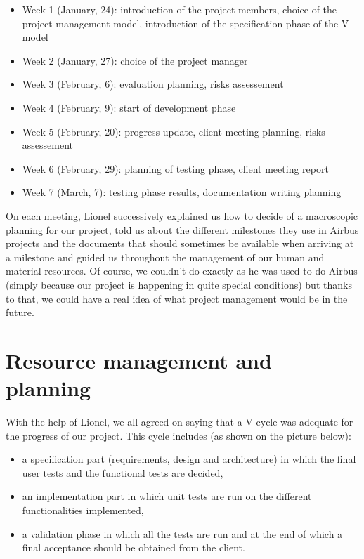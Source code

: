 \documentclass{report}
\begin{document}
\begin{itemize}


	\item Week 1 (January, 24): introduction of the project members, choice of the project management model, introduction of the specification phase of the V model
	\item Week 2 (January, 27): choice of the project manager
	\item Week 3 (February, 6): evaluation planning, risks assessement
	\item Week 4 (February, 9): start of development phase
	\item Week 5 (February, 20): progress update, client meeting planning, risks assessement
	\item Week 6 (February, 29): planning of testing phase, client meeting report
	\item Week 7 (March, 7): testing phase results, documentation writing planning

\end{itemize}

On each meeting, Lionel successively explained us how to decide of a macroscopic planning for our project, told us about the different milestones they use in Airbus projects and the documents that should sometimes be available when arriving at a milestone and guided us throughout the management of our human and material resources. Of course, we couldn't do exactly as he was used to do Airbus (simply because our project is happening in quite special conditions) but thanks to that, we could have a real idea of what project management would be in the future. 

\section{Resource management and planning}

With the help of Lionel, we all agreed on saying that a V-cycle was adequate for the progress of our project. This cycle includes (as shown on the picture below):

\begin{itemize}
	\item a specification part (requirements, design and architecture) in which the final user tests and the functional tests are decided,
	\item an implementation part in which unit tests are run on the different functionalities implemented,
	\item a validation phase in which all the tests are run and at the end of which a final acceptance should be obtained from the client.
\end{itemize}
\end{document}
